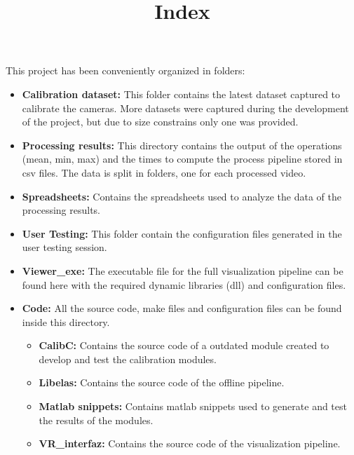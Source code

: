 \documentclass[]{article}
\title{Index}
\author{}
\begin{document}
\maketitle

This project has been conveniently organized in folders:

\begin{itemize}
	\item \textbf{Calibration dataset:} This folder contains the latest dataset captured to calibrate the cameras. More datasets were captured during the development of the project, but due to size constrains only one was provided.
	
	\item \textbf{Processing results:} This directory contains the output of the operations (mean, min, max) and the times to compute the process pipeline stored in csv files.  The data is split in folders, one for each processed video.
	
	\item \textbf{Spreadsheets:} Contains the spreadsheets used to analyze the data of the processing results.
	
	\item \textbf{User Testing:} This folder contain the configuration files generated in the user testing session.
	
	\item \textbf{Viewer\_exe:} The executable file for the full visualization pipeline can be found here with the required dynamic libraries (dll) and configuration files.
	
	\item \textbf{Code:} All the source code, make files and configuration files can be found inside this directory.
	\begin{itemize}
		\item \textbf{CalibC:} Contains the source code of a outdated module created to develop and test the calibration modules.
		
		\item \textbf{Libelas:} Contains the source code of the offline pipeline.
		
		\item \textbf{Matlab snippets:}  Contains matlab snippets used to generate and test the results of the modules.
		
		\item \textbf{VR\_interfaz:}  Contains the source code of the visualization pipeline.
	\end{itemize}
	

\end{itemize}
\end{document}
